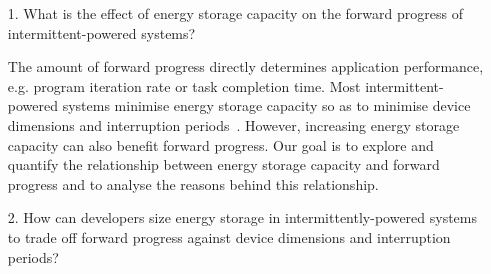 \begin{itemize}

  

  

  \item[1.] What is the effect of energy storage capacity on the forward progress of intermittent-powered systems? 
  
  The amount of forward progress directly determines application performance, e.g. program iteration rate or task completion time. 
  Most intermittent-powered systems minimise energy storage capacity so as to minimise device dimensions and interruption periods~\cite{7442814, 10.1145/2700249, 10.1145/2809695.2809707, 10.1145/3281300, 222579}. 
  However, increasing energy storage capacity can also benefit forward progress. 
  Our goal is to explore and quantify the relationship between energy storage capacity and forward progress and to analyse the reasons behind this relationship. 

  \item[2.] How can developers size energy storage in intermittently-powered systems to trade off forward progress against device dimensions and interruption periods?
  

\end{itemize}
